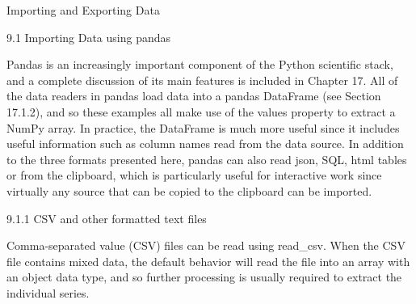 Importing and Exporting Data

9.1 Importing Data using pandas

Pandas is an increasingly important component of the Python scientific stack, and a complete discussion
of its main features is included in Chapter 17. All of the data readers in pandas load data into a pandas
DataFrame (see Section 17.1.2), and so these examples all make use of the values property to extract a
NumPy array. In practice, the DataFrame is much more useful since it includes useful information such
as column names read from the data source. In addition to the three formats presented here, pandas can
also read json, SQL, html tables or from the clipboard, which is particularly useful for interactive work
since virtually any source that can be copied to the clipboard can be imported.

9.1.1 CSV and other formatted text files

Comma-separated value (CSV) files can be read using read_csv. When the CSV file contains mixed data,
the default behavior will read the file into an array with an object data type, and so further processing is
usually required to extract the individual series.
